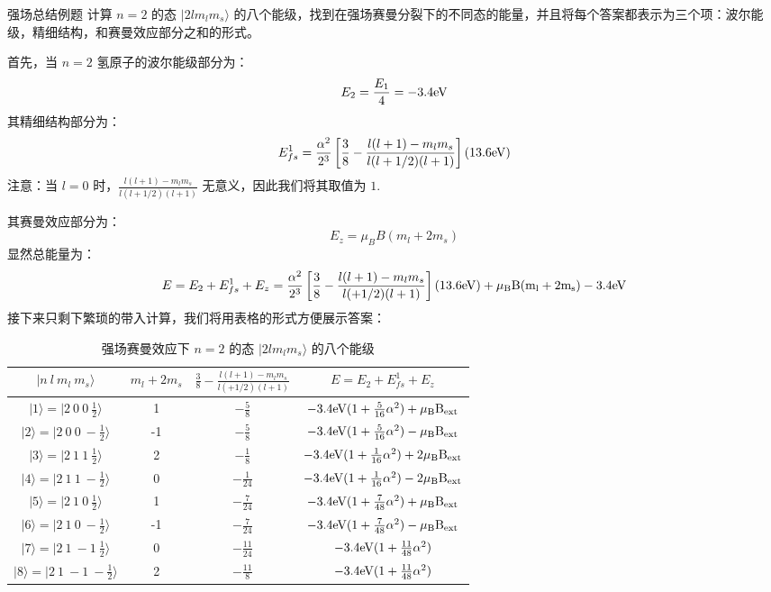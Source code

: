 \begin{example}{强场总结例题}
计算 $n=2$ 的态 $|2lm_lm_s\rangle$ 的八个能级，找到在强场赛曼分裂下的不同态的能量，并且将每个答案都表示为三个项：波尔能级，精细结构，和赛曼效应部分之和的形式。

首先，当 $n=2$ 氢原子的波尔能级部分为：
\begin{equation}
E_2=\frac{E_1}{4}=-3.4\rm{eV}
\end{equation}
其精细结构部分为：
\begin{equation}
E_{fs}^1=\frac{\alpha^2}{2^3}\left[\frac{3}{8}-\frac{l(l+1)-m_lm_s}{l(l+1/2)(l+1)}\right](13.6 \rm{eV})
\end{equation}
注意：当 $l=0$ 时，$\frac{l(l+1)-m_lm_s}{l(l+1/2)(l+1)}$ 无意义，因此我们将其取值为 $1$.

其赛曼效应部分为：
\begin{equation}
E_z =\mu_BB(m_l+2m_s)
\end{equation}
显然总能量为：
\begin{equation}
E=E_2+E_{fs}^1+E_z = \frac{\alpha^2}{2^3}\left[\frac{3}{8}-\frac{l(l+1)-m_lm_s}{l(+1/2)(l+1)}\right](13.6 \rm{eV})+\mu_BB(m_l+2m_s)-3.4 \rm{eV}
\end{equation}
接下来只剩下繁琐的带入计算，我们将用表格的形式方便展示答案：
\begin{table}[ht]
\centering
\caption{强场赛曼效应下 $n=2$ 的态 $|2lm_lm_s\rangle$ 的八个能级}\label{tab_ZemEff_1}
\begin{tabular}{|c|c|c|c|}
\hline
$|n \ l \ m_l \ m_s\rangle$& $m_l+2m_s$ & $\frac{3}{8}-\frac{l(l+1)-m_lm_s}{l(+1/2)(l+1)}$ & $E=E_2+E_{fs}^1+E_z $ \\
\hline
$|1\rangle = |2\ 0 \ 0 \ \frac{1}{2}\rangle$ & 1 & $-\frac{5}{8}$ & $-3.4 \rm{eV}(1+\frac{5}{16}\alpha^2)+\mu_BB_{ext}$ \\
\hline
$|2\rangle = |2\ 0 \ 0 \ -\frac{1}{2}\rangle$ & -1 & $-\frac{5}{8}$ & $-3.4 \rm{eV}(1+\frac{5}{16}\alpha^2)-\mu_BB_{ext}$ \\
\hline
$|3\rangle = |2\ 1 \ 1 \ \frac{1}{2}\rangle$ & 2 & $-\frac{1}{8}$ & $-3.4 \rm{eV}(1+\frac{1}{16}\alpha^2)+2\mu_BB_{ext}$ \\
\hline
$|4\rangle = |2\ 1 \ 1 \ -\frac{1}{2}\rangle$ & 0 & $-\frac{1}{24}$ & $-3.4 \rm{eV}(1+\frac{1}{16}\alpha^2)-2\mu_BB_{ext}$ \\
\hline
$|5\rangle = |2\ 1 \ 0 \ \frac{1}{2}\rangle$ & 1 & $-\frac{7}{24}$ & $-3.4 \rm{eV}(1+\frac{7}{48}\alpha^2)+\mu_BB_{ext}$ \\
\hline
$|6\rangle = |2\ 1 \ 0 \ -\frac{1}{2}\rangle$ & -1 & $-\frac{7}{24}$ & $-3.4 \rm{eV}(1+\frac{7}{48}\alpha^2)-\mu_BB_{ext}$ \\
\hline
$|7\rangle = |2\ 1 \ -1 \ \frac{1}{2}\rangle$ & 0 & $-\frac{11}{24}$ & $-3.4 \rm{eV}(1+\frac{11}{48}\alpha^2)$ \\
\hline
$|8\rangle = |2\ 1 \ -1 \ -\frac{1}{2}\rangle$ & 2 & $-\frac{11}{8}$ & $-3.4 \rm{eV}(1+\frac{11}{48}\alpha^2)$ \\
\hline
\end{tabular}
\end{table}
\end{example}
